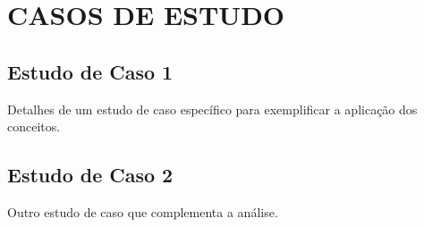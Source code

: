 \chapter{CASOS DE ESTUDO}
\section{Estudo de Caso 1}
Detalhes de um estudo de caso específico para exemplificar a aplicação dos conceitos.

\section{Estudo de Caso 2}
Outro estudo de caso que complementa a análise.
